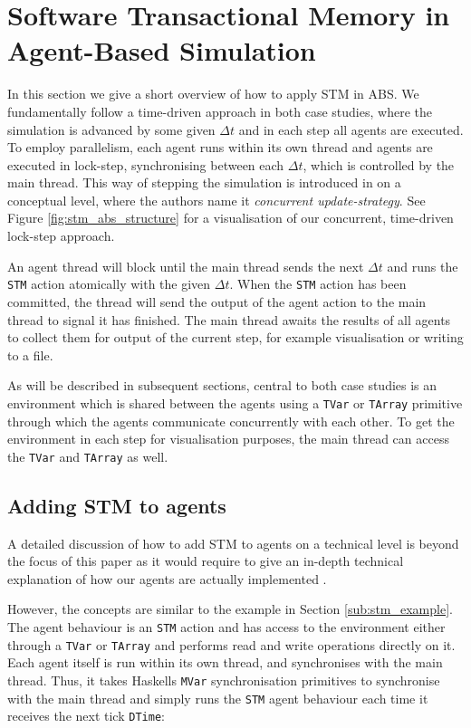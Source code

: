 \section{Software Transactional Memory in Agent-Based Simulation}
\label{sec:stm_abs}
In this section we give a short overview of how to apply STM in ABS. We fundamentally follow a time-driven approach in both case studies, where the simulation is advanced by some given $\Delta t$ and in each step all agents are executed. To employ parallelism, each agent runs within its own thread and agents are executed in lock-step, synchronising between each $\Delta t$, which is controlled by the main thread. This way of stepping the simulation is introduced in \cite{thaler_art_2017} on a conceptual level, where the authors name it \textit{concurrent update-strategy}. See Figure \ref{fig:stm_abs_structure} for a visualisation of our concurrent, time-driven lock-step approach. 

An agent thread will block until the main thread sends the next $\Delta t$ and runs the \texttt{STM} action atomically with the given $\Delta t$. When the \texttt{STM} action has been committed, the thread will send the output of the agent action to the main thread to signal it has finished. The main thread awaits the results of all agents to collect them for output of the current step, for example visualisation or writing to a file.

As will be described in subsequent sections, central to both case studies is an environment which is shared between the agents using a \texttt{TVar} or \texttt{TArray} primitive through which the agents communicate concurrently with each other. To get the environment in each step for visualisation purposes, the main thread can access the \texttt{TVar} and \texttt{TArray} as well. 

\subsection{Adding STM to agents}
A detailed discussion of how to add STM to agents on a technical level is beyond the focus of this paper as it would require to give an in-depth technical explanation of how our agents are actually implemented \cite{thaler_pure_2018}.

However, the concepts are similar to the example in Section \ref{sub:stm_example}. The agent behaviour is an \texttt{STM} action and has access to the environment either through a \texttt{TVar} or \texttt{TArray} and performs read and write operations directly on it. Each agent itself is run within its own thread, and synchronises with the main thread. Thus, it takes Haskells \texttt{MVar} synchronisation primitives to synchronise with the main thread and simply runs the \texttt{STM} agent behaviour each time it receives the next tick \texttt{DTime}: \\ %

